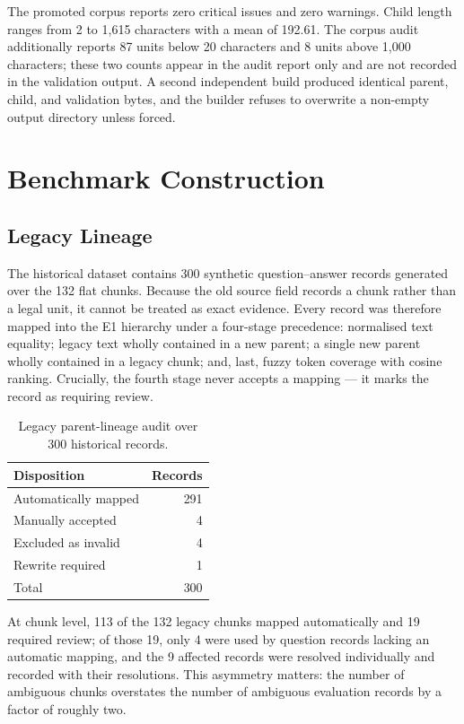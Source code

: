 The promoted corpus reports zero critical issues and zero warnings. Child length ranges from 2 to 1{,}615 characters with a mean of 192.61. The corpus audit additionally reports 87 units below 20 characters and 8 units above 1{,}000 characters; these two counts appear in the audit report only and are not recorded in the validation output. A second independent build produced identical parent, child, and validation bytes, and the builder refuses to overwrite a non-empty output directory unless forced.

\section{Benchmark Construction}
\label{sec:method-benchmark}

\subsection{Legacy Lineage}

The historical dataset contains 300 synthetic question--answer records generated over the 132 flat chunks. Because the old source field records a chunk rather than a legal unit, it cannot be treated as exact evidence. Every record was therefore mapped into the E1 hierarchy under a four-stage precedence: normalised text equality; legacy text wholly contained in a new parent; a single new parent wholly contained in a legacy chunk; and, last, fuzzy token coverage with cosine ranking. Crucially, the fourth stage never accepts a mapping --- it marks the record as requiring review.

\begin{table}[htbp]
  \centering
  \caption{Legacy parent-lineage audit over 300 historical records.}
  \label{tab:legacy-lineage}
  \begin{tabular}{lr}
    \toprule
    \textbf{Disposition} & \textbf{Records} \\
    \midrule
    Automatically mapped & 291 \\
    Manually accepted & 4 \\
    Excluded as invalid & 4 \\
    Rewrite required & 1 \\
    \midrule
    Total & 300 \\
    \bottomrule
  \end{tabular}
\end{table}

At chunk level, 113 of the 132 legacy chunks mapped automatically and 19 required review; of those 19, only 4 were used by question records lacking an automatic mapping, and the 9 affected records were resolved individually and recorded with their resolutions. This asymmetry matters: the number of ambiguous chunks overstates the number of ambiguous evaluation records by a factor of roughly two.

